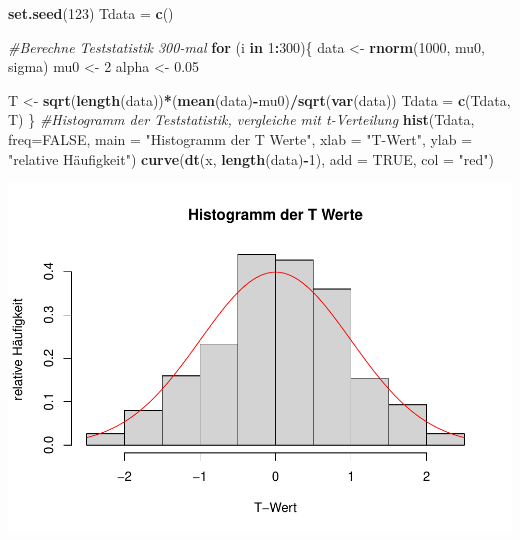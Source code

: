 \documentclass[]{article}
\newenvironment{Shaded}{\begin{snugshade}}{\end{snugshade}}
\newcommand{\CommentTok}[1]{\textcolor[rgb]{0.56,0.35,0.01}{\textit{#1}}}
\newcommand{\ControlFlowTok}[1]{\textcolor[rgb]{0.13,0.29,0.53}{\textbf{#1}}}
\newcommand{\DataTypeTok}[1]{\textcolor[rgb]{0.13,0.29,0.53}{#1}}
\newcommand{\DecValTok}[1]{\textcolor[rgb]{0.00,0.00,0.81}{#1}}
\newcommand{\FloatTok}[1]{\textcolor[rgb]{0.00,0.00,0.81}{#1}}
\newcommand{\KeywordTok}[1]{\textcolor[rgb]{0.13,0.29,0.53}{\textbf{#1}}}
\newcommand{\NormalTok}[1]{#1}
\newcommand{\OperatorTok}[1]{\textcolor[rgb]{0.81,0.36,0.00}{\textbf{#1}}}
\newcommand{\OtherTok}[1]{\textcolor[rgb]{0.56,0.35,0.01}{#1}}
\newcommand{\StringTok}[1]{\textcolor[rgb]{0.31,0.60,0.02}{#1}}
\begin{document}
\begin{Shaded}
\begin{Highlighting}[]
\KeywordTok{set.seed}\NormalTok{(}\DecValTok{123}\NormalTok{)}
\NormalTok{Tdata =}\StringTok{ }\KeywordTok{c}\NormalTok{()}

\CommentTok{#Berechne Teststatistik 300-mal}
\ControlFlowTok{for}\NormalTok{ (i }\ControlFlowTok{in} \DecValTok{1}\OperatorTok{:}\DecValTok{300}\NormalTok{)\{}
\NormalTok{  data <-}\StringTok{ }\KeywordTok{rnorm}\NormalTok{(}\DecValTok{1000}\NormalTok{, mu0, sigma)}
\NormalTok{  mu0 <-}\StringTok{ }\DecValTok{2}
\NormalTok{  alpha <-}\StringTok{ }\FloatTok{0.05}

\NormalTok{  T <-}\StringTok{ }\KeywordTok{sqrt}\NormalTok{(}\KeywordTok{length}\NormalTok{(data))}\OperatorTok{*}\NormalTok{(}\KeywordTok{mean}\NormalTok{(data)}\OperatorTok{-}\NormalTok{mu0)}\OperatorTok{/}\KeywordTok{sqrt}\NormalTok{(}\KeywordTok{var}\NormalTok{(data))}
\NormalTok{  Tdata =}\StringTok{ }\KeywordTok{c}\NormalTok{(Tdata, T)}
\NormalTok{\}}
\CommentTok{#Histogramm der Teststatistik, vergleiche mit t-Verteilung}
\KeywordTok{hist}\NormalTok{(Tdata, }\DataTypeTok{freq=}\OtherTok{FALSE}\NormalTok{, }\DataTypeTok{main =} \StringTok{"Histogramm der T Werte"}\NormalTok{,}
     \DataTypeTok{xlab =} \StringTok{"T-Wert"}\NormalTok{, }\DataTypeTok{ylab =} \StringTok{"relative Häufigkeit"}\NormalTok{)}
\KeywordTok{curve}\NormalTok{(}\KeywordTok{dt}\NormalTok{(x, }\KeywordTok{length}\NormalTok{(data)}\OperatorTok{-}\DecValTok{1}\NormalTok{), }\DataTypeTok{add =} \OtherTok{TRUE}\NormalTok{, }\DataTypeTok{col =} \StringTok{"red"}\NormalTok{)}
\end{Highlighting}
\end{Shaded}

\includegraphics{BelaSchinkeAusarbeitung_files/figure-latex/unnamed-chunk-5-1.pdf}
\end{document}
